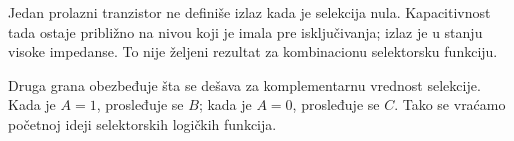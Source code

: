 Jedan prolazni tranzistor ne definiše izlaz kada je selekcija nula. Kapacitivnost tada ostaje približno na nivou koji je imala pre isključivanja; izlaz je u stanju visoke impedanse. To nije željeni rezultat za kombinacionu selektorsku funkciju.

Druga grana obezbeđuje šta se dešava za komplementarnu vrednost selekcije. Kada je $A=1$, prosleđuje se $B$; kada je $A=0$, prosleđuje se $C$. Tako se vraćamo početnoj ideji selektorskih logičkih funkcija.
